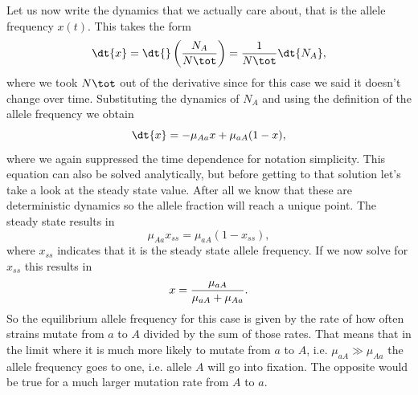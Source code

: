 Let us now write the dynamics that we actually care about, that is the allele
frequency $x(t)$. This takes the form
\begin{equation}
  \dt{x} = \dt{}\left( {N_A \over N\tot} \right) = {1 \over N\tot} \dt{N_A},
\end{equation}
where we took $N\tot$ out of the derivative since for this case we said it
doesn't change over time. Substituting the dynamics of $N_A$ and using the
definition of the allele frequency we obtain
\begin{equation}
  \dt{x} = - \mu_{A a} x + \mu_{a A} (1 - x),
  \label{eq_mutation_ode}
\end{equation}
where we again suppressed the time dependence for notation simplicity. This
equation can also be solved analytically, but before getting to that solution
let's take a look at the steady state value. After all we know that these are
deterministic dynamics so the allele fraction will reach a unique point. The
steady state results in
\begin{equation}
  \mu_{A a} x_{ss} = \mu_{a A} (1 - x_{ss}),
\end{equation}
where $x_{ss}$ indicates that it is the steady state allele frequency. If we
now solve for $x_{ss}$ this results in
\begin{equation}
  x = {\mu_{a A} \over \mu_{a A} + \mu_{A a}}.
\end{equation}
So the equilibrium allele frequency for this case is given by the rate of how
often strains mutate from $a$ to $A$ divided by the sum of those rates. That
means that in the limit where it is much more likely to mutate from $a$ to $A$,
i.e. $\mu_{a A} \gg \mu_{A a}$ the allele frequency goes
to one, i.e. allele $A$ will go into fixation. The opposite would be true for a
much larger mutation rate from $A$ to $a$.

